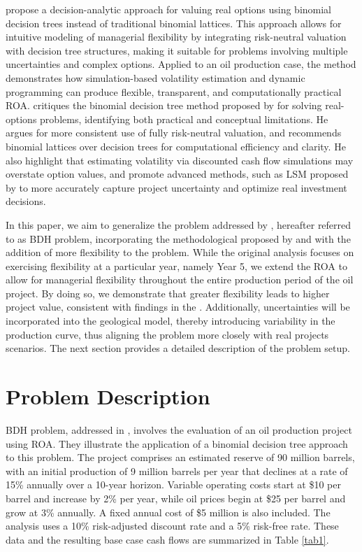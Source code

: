 \documentclass[pdflatex,sn-basic]{sn-jnl}%
\theoremstyle{thmstyleone}%
\theoremstyle{thmstyletwo}%
\theoremstyle{thmstylethree}%
\begin{document}
\cite{ref12} propose a decision-analytic approach for valuing real options using binomial decision trees instead of traditional binomial lattices. This approach allows for intuitive modeling of managerial flexibility by integrating risk-neutral valuation with decision tree structures, making it suitable for problems involving multiple uncertainties and complex options. Applied to an oil production case, the method demonstrates how simulation-based volatility estimation and dynamic programming can produce flexible, transparent, and computationally practical ROA. \cite{ref13} critiques the binomial decision tree method proposed by \cite{ref12} for solving real-options problems, identifying both practical and conceptual limitations. He argues for more consistent use of fully risk-neutral valuation, and recommends binomial lattices over decision trees for computational efficiency and clarity. He also highlight that estimating volatility via discounted cash flow simulations may overstate option values, and promote advanced methods, such as LSM proposed by \cite{ref14} to more accurately capture project uncertainty and optimize real investment decisions.

In this paper, we aim to generalize the problem addressed by \cite{ref12}, hereafter referred to as BDH problem, incorporating the methodological proposed by \cite{ref13} and with the addition of more flexibility to the problem. While the original analysis focuses on exercising flexibility at a particular year, namely Year 5, we extend the ROA to allow for managerial flexibility throughout the entire production period of the oil project. By doing so, we demonstrate that greater flexibility leads to higher project value, consistent with findings in the \cite{ref9}. Additionally, uncertainties will be incorporated into the geological model, thereby introducing variability in the production curve, thus aligning the problem more closely with real projects scenarios. The next section provides a detailed description of the problem setup.

\section{Problem Description}\label{sec23}

BDH problem, addressed in \cite{ref12}, involves the evaluation of an oil production project using ROA. They illustrate the application of a binomial decision tree approach to this problem. The project comprises an estimated reserve of 90 million barrels, with an initial production of 9 million barrels per year that declines at a rate of 15\% annually over a 10-year horizon. Variable operating costs start at \$10 per barrel and increase by 2\% per year, while oil prices begin at \$25 per barrel and grow at 3\% annually. A fixed annual cost of \$5 million is also included. The analysis uses a 10\% risk-adjusted discount rate and a 5\% risk-free rate. These data and the resulting base case cash flows are summarized in Table \ref{tab1}.
\end{document}
